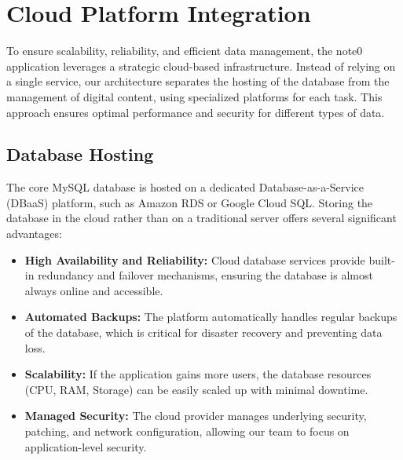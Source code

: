 \documentclass[12pt, a4paper]{report}
\begin{document}
\section{Cloud Platform Integration}
To ensure scalability, reliability, and efficient data management, the note0 application leverages a strategic cloud-based infrastructure. Instead of relying on a single service, our architecture separates the hosting of the database from the management of digital content, using specialized platforms for each task. This approach ensures optimal performance and security for different types of data.

\subsection{Database Hosting}
The core MySQL database is hosted on a dedicated Database-as-a-Service (DBaaS) platform, such as Amazon RDS or Google Cloud SQL. Storing the database in the cloud rather than on a traditional server offers several significant advantages:
\begin{itemize}
    \item \textbf{High Availability and Reliability:} Cloud database services provide built-in redundancy and failover mechanisms, ensuring the database is almost always online and accessible.
    \item \textbf{Automated Backups:} The platform automatically handles regular backups of the database, which is critical for disaster recovery and preventing data loss.
    \item \textbf{Scalability:} If the application gains more users, the database resources (CPU, RAM, Storage) can be easily scaled up with minimal downtime.
    \item \textbf{Managed Security:} The cloud provider manages underlying security, patching, and network configuration, allowing our team to focus on application-level security.
\end{itemize}
\end{document}
